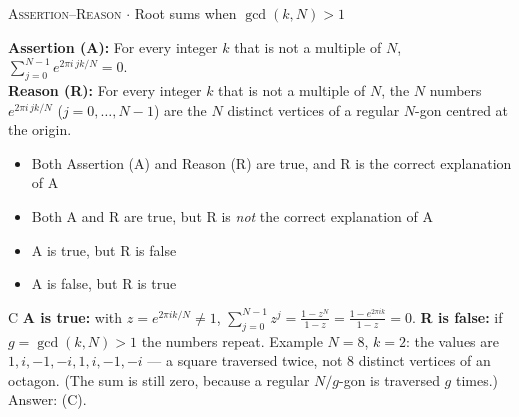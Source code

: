 \documentclass[11pt,a4paper]{article}
\newcommand{\optlabel}[1]{\textbf{(#1)}}
\newcommand{\correctlabel}[1]{\textcolor{okgreen}{\textbf{(#1)}\,\ding{51}}}
\newenvironment{qitem}[1]{\begin{list}{}{\setlength{\leftmargin}{3.3em}\setlength{\labelwidth}{3.1em}%
  \setlength{\labelsep}{0.2em}\setlength{\topsep}{3pt}\setlength{\parsep}{3pt}}\item[\textbf{Q.#1}\hfill]}{\end{list}}
\newcommand{\qsep}{\par\vspace{2pt}{\color{black!15}\hrule}\vspace{4pt}}
\newcommand{\qmeta}[2]{{\footnotesize\color{black!60}\textsc{#1} \;$\cdot$\; #2}\par}
\begin{document}
\begin{qitem}{17}
\qmeta{Assertion--Reason}{Root sums when $\gcd(k,N)>1$}
\textbf{Assertion (A):} For every integer $k$ that is not a multiple of $N$, $\displaystyle\sum_{j=0}^{N-1} e^{2\pi i\,jk/N} = 0$.\\[1mm]
\textbf{Reason (R):} For every integer $k$ that is not a multiple of $N$, the $N$ numbers $e^{2\pi i\,jk/N}$
($j = 0, \dots, N-1$) are the $N$ distinct vertices of a regular $N$-gon centred at the origin.
\begin{itemize}[leftmargin=2.6em, labelsep=0.4em, itemsep=2pt, topsep=3pt]
\item[\optlabel{A}] Both Assertion (A) and Reason (R) are true, and R is the correct explanation of A
\item[\optlabel{B}] Both A and R are true, but R is \emph{not} the correct explanation of A
\item[\correctlabel{C}] A is true, but R is false
\item[\optlabel{D}] A is false, but R is true
\end{itemize}
\end{qitem}
\begin{solbox}{C}
\textbf{A is true:} with $z = e^{2\pi i k/N} \neq 1$, $\sum_{j=0}^{N-1} z^j = \frac{1-z^N}{1-z} = \frac{1 - e^{2\pi i k}}{1-z} = 0$.
\textbf{R is false:} if $g = \gcd(k, N) > 1$ the numbers repeat. Example $N = 8$, $k = 2$: the values are
$1, i, -1, -i, 1, i, -1, -i$ --- a square traversed twice, not 8 distinct vertices of an octagon. (The sum is still zero,
because a regular $N/g$-gon is traversed $g$ times.) Answer: (C).
\end{solbox}
\qsep
\end{document}
